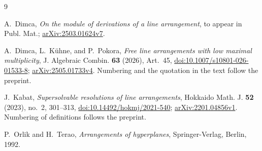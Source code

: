 \documentclass[11pt]{amsart}
\begin{document}
\begin{thebibliography}{9}

A.~Dimca,
\emph{On the module of derivations of a line arrangement},
to appear in Publ. Mat.;
\href{https://arxiv.org/abs/2503.01624v7}{arXiv:2503.01624v7}.

A.~Dimca, L.~K\"uhne, and P.~Pokora,
\emph{Free line arrangements with low maximal multiplicity},
J. Algebraic Combin. \textbf{63} (2026), Art.~45,
\href{https://doi.org/10.1007/s10801-026-01533-8}
{doi:10.1007/s10801-026-01533-8};
\href{https://arxiv.org/abs/2505.01733v4}{arXiv:2505.01733v4}.
Numbering and the quotation in the text follow the preprint.

J.~Kabat,
\emph{Supersolvable resolutions of line arrangements},
Hokkaido Math. J. \textbf{52} (2023), no.~2, 301--313,
\href{https://doi.org/10.14492/hokmj/2021-540}
{doi:10.14492/hokmj/2021-540};
\href{https://arxiv.org/abs/2201.04856v1}{arXiv:2201.04856v1}.
Numbering of definitions follows the preprint.

P.~Orlik and H.~Terao,
\emph{Arrangements of hyperplanes},
Springer-Verlag, Berlin, 1992.

\end{thebibliography}
\end{document}

